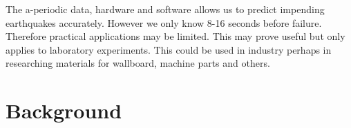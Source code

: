\documentclass[]{llncs}
\begin{document}
The a-periodic data, hardware and software allows us to predict impending earthquakes accurately. However we only know 8-16 seconds before failure. Therefore practical applications may be limited. This may prove useful but only applies to laboratory experiments. This could be used in industry perhaps in researching materials for wallboard, machine parts and others.\par


\section{Background}




\end{document}
